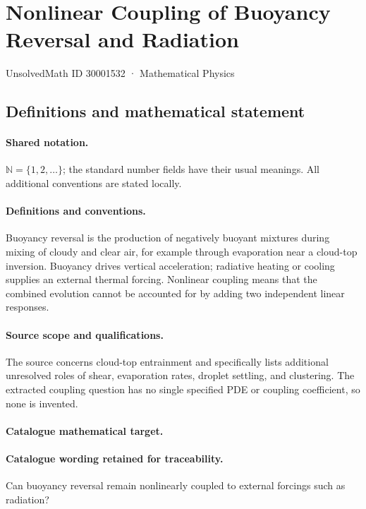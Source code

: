 \documentclass[11pt]{article}
\begin{document}
\setcounter{section}{30001531}
\section{Nonlinear Coupling of Buoyancy Reversal and Radiation}\label{30001532}
{\small UnsolvedMath ID 30001532 · Mathematical Physics}
\subsection{Definitions and mathematical statement}

\paragraph{Shared notation.}$\mathbb N=\{1,2,\ldots\}$; the standard number fields have their usual meanings. All additional conventions are stated locally.


\paragraph{Definitions and conventions.} Buoyancy reversal is the production of negatively buoyant mixtures during mixing of cloudy and clear air, for example through evaporation near a cloud-top inversion. Buoyancy drives vertical acceleration; radiative heating or cooling supplies an external thermal forcing. Nonlinear coupling means that the combined evolution cannot be accounted for by adding two independent linear responses.

\paragraph{Source scope and qualifications.} The source concerns cloud-top entrainment and specifically lists additional unresolved roles of shear, evaporation rates, droplet settling, and clustering. The extracted coupling question has no single specified PDE or coupling coefficient, so none is invented.

\paragraph{Catalogue mathematical target.}
\paragraph{Catalogue wording retained for traceability.}
Can buoyancy reversal remain nonlinearly coupled to external forcings such as radiation?
\end{document}
